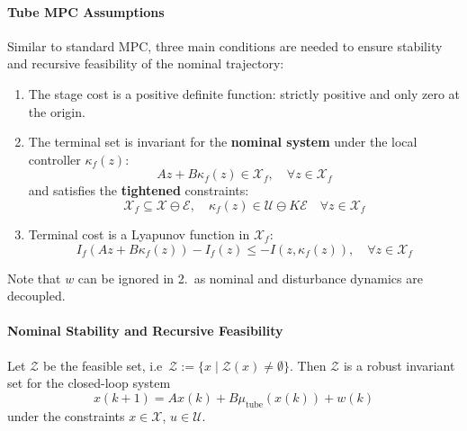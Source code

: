\paragraph{Tube MPC Assumptions}\label{08_tube_assumptions}
Similar to standard MPC, three main conditions are needed to ensure stability and recursive feasibility of the nominal trajectory:
\newpar{}
\begin{enumerate}
    \item The stage cost is a positive definite function: strictly positive and only zero at the origin.
    \item The terminal set is invariant for the \textbf{nominal system} under the local controller $\kappa_f(z)$:
          \begin{equation*}
              A z + B \kappa_f(z) \in \mathcal{X}_f, \quad \forall z \in \mathcal{X}_f
          \end{equation*}
          and satisfies the \textbf{tightened} constraints:
          \begin{equation*}
              \mathcal{X}_f \subseteq \mathcal{X} \ominus \mathcal{E}, \quad \kappa_f(z) \in \mathcal{U} \ominus K \mathcal{E} \quad \forall z \in \mathcal{X}_f
          \end{equation*}
    \item Terminal cost is a Lyapunov function in $\mathcal{X}_f$:
          \begin{equation*}
              I_f(Az + B\kappa_f(z)) - I_f(z) \leq -I(z, \kappa_f(z)), \quad \forall z \in \mathcal{X}_f
          \end{equation*}
\end{enumerate}
Note that $w$ can be ignored in 2.\ as nominal and disturbance dynamics are decoupled.

\paragraph{Nominal Stability and Recursive Feasibility}


Let $\mathcal{Z}$ be the feasible set, i.e\ $\mathcal{Z} := \{x \mid \mathcal{Z}(x) \neq \emptyset\}$. Then $\mathcal{Z}$ is a robust invariant set for the closed-loop system
\begin{equation*}
    x(k + 1) = A x(k) + B \mu_{\text{tube}}(x(k)) + w(k)
\end{equation*}
under the constraints $x \in \mathcal{X}$, $u \in \mathcal{U}$.
\newpar{}

